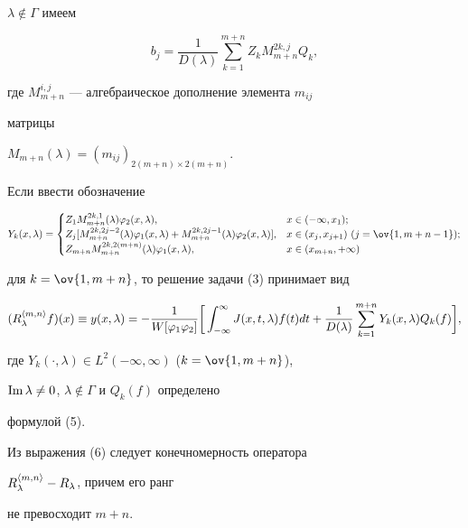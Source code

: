 \begin{pf}
$\lambda\notin\Gamma$ имеем 


$$ 


b_j=\frac{1}{D(\lambda)}\sum^{m+n}_{k=1}Z_k 


M^{2k,j}_{m+n}Q_k, 


$$ 


где $M^{i,j}_{m+n}$ --- алгебраическое дополнение элемента $m_{ij}$ 


матрицы 


$M_{m+n}(\lambda)=(m_{ij})_{2(m+n)\times 2(m+n)}$. 


 


Если ввести обозначение 


$$ 


Y_k(x,\lambda)= 


\begin{cases} 


Z_1M^{2k,1}_{m+n}(\lambda)\varphi_2(x,\lambda), 


& x\in(-\infty,x_1); \\ 


Z_j[M^{2k,2j-2}_{m+n}(\lambda)\varphi_1(x,\lambda)+ 


M^{2k,2j-1}_{m+n}(\lambda)\varphi_2(x,\lambda)], 


& x\in(x_j,x_{j+1}) \ (j=\ov{1,m+n-1}); \\ 


Z_{m+n}M^{2k,2(m+n)}_{m+n}(\lambda)\varphi_1(x,\lambda), 


& x\in(x_{m+n},+\infty) 


\end{cases} 


$$ 


для $k=\ov{1,m+n}$, то решение задачи (3) принимает вид 


\begin{equation} 


(R^{\la m,n\ra}_\lambda f)(x)\equiv y(x,\lambda)= 


-\frac{1}{W[\varphi_1\varphi_2]}\biggl[\, 


\int^\infty_{-\infty}J(x,t,\lambda)f(t)dt+ 


\frac{1}{D(\lambda)}\sum^{m+n}_{k=1}Y_k(x,\lambda) 


Q_k(f)\biggr], 


\end{equation} 


где $Y_k(\cdot,\lambda)\in L^2(-\infty,\infty)$ ($k=\ov{1,m+n}$), 


$\operatorname{Im}\lambda\ne 0$, $\lambda\notin\Gamma$ и $Q_k(f)$ определено 


формулой (5). 


 


Из выражения (6) следует конечномерность оператора 


$R^{\langle m,n\rangle}_\lambda-R_\lambda$, причем его ранг 


не превосходит $m+n$. 


\end{pf} 


